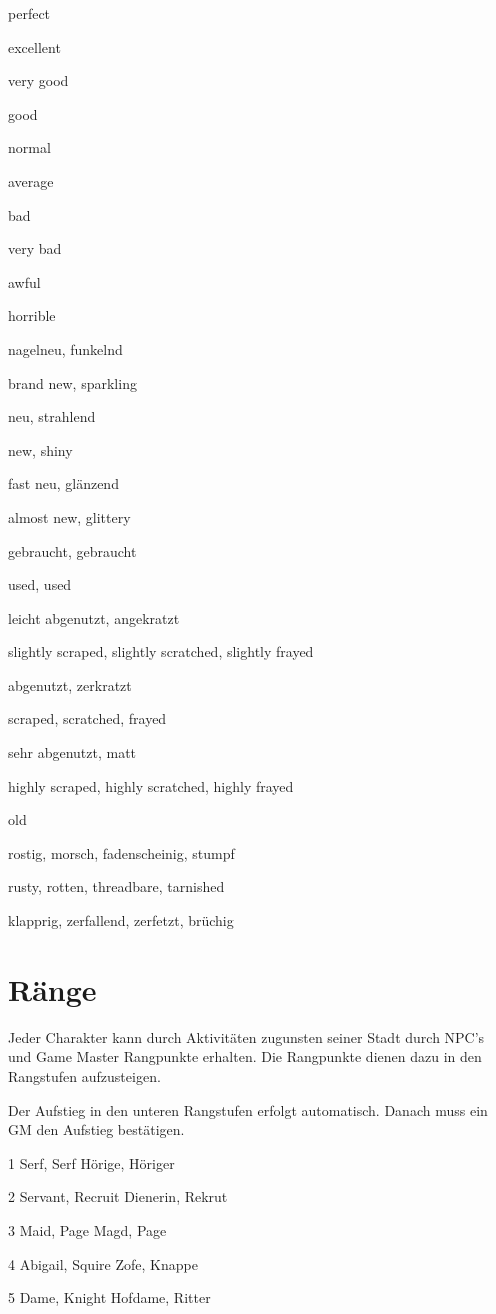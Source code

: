 \documentclass[a4paper,11pt]{book}
\begin{document}
perfect

excellent

very good

good

normal

average

bad

very bad

awful

horrible

nagelneu, funkelnd

brand new, sparkling

neu, strahlend

new, shiny

fast neu, glänzend

almost new, glittery

gebraucht, gebraucht

used, used

leicht abgenutzt, angekratzt

slightly scraped, slightly scratched, slightly frayed

abgenutzt, zerkratzt

scraped, scratched, frayed

sehr abgenutzt, matt

highly scraped, highly scratched, highly frayed

old

rostig, morsch, fadenscheinig, stumpf

rusty, rotten, threadbare, tarnished

klapprig, zerfallend, zerfetzt, brüchig

\section{Ränge}

Jeder Charakter kann durch Aktivitäten zugunsten seiner Stadt durch NPC’s und Game Master Rangpunkte erhalten. Die Rangpunkte dienen dazu in den Rangstufen aufzusteigen.

Der Aufstieg in den unteren Rangstufen erfolgt automatisch. Danach muss ein GM den Aufstieg bestätigen.

1  Serf, Serf  Hörige, Höriger

2  Servant, Recruit  Dienerin, Rekrut

3  Maid, Page  Magd, Page

4  Abigail, Squire  Zofe, Knappe

5  Dame, Knight  Hofdame, Ritter
\end{document}
